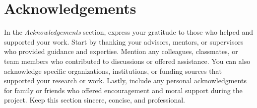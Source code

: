 {%
    \chapter*{Acknowledgements}
}

In the \textit{Acknowledgements} section, express your gratitude to those who helped and supported your work. Start by thanking your advisors, mentors, or supervisors who provided guidance and expertise. Mention any colleagues, classmates, or team members who contributed to discussions or offered assistance. You can also acknowledge specific organizations, institutions, or funding sources that supported your research or work. Lastly, include any personal acknowledgments for family or friends who offered encouragement and moral support during the project. Keep this section sincere, concise, and professional.
